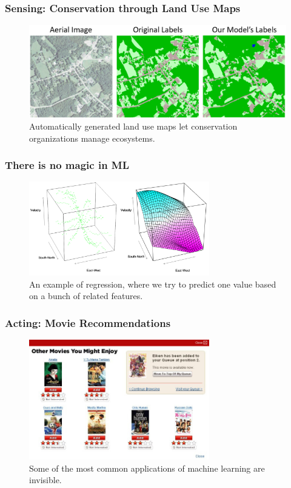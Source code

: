 \documentclass[10pt,mathserif]{beamer}
\begin{document}
\begin{frame}
  \frametitle{Sensing: Conservation through Land Use Maps}
  \begin{figure}[ht]
    \centering
    \includegraphics[width=0.7\paperwidth]{figures/landcover}
    \caption{Automatically generated land use maps let conservation
      organizations manage ecosystems. \label{fig:landcover} }
  \end{figure}
\end{frame}

\begin{frame}
  \frametitle{There is no magic in ML}
  \begin{figure}[ht]
    \centering
    \includegraphics[width=0.7\textwidth]{figures/galaxy}
    \caption{An example of regression, where we try to predict one value based
      on a bunch of related features. \label{fig:astronomy} }
  \end{figure}
\end{frame}

\begin{frame}
  \frametitle{Acting: Movie Recommendations}
  \begin{figure}[ht]
    \centering
    \includegraphics[width=0.7\textwidth]{figures/netflix_abstraction}
    \caption{Some of the most common applications of machine learning are
      invisible.}
  \end{figure}
\end{frame}
\end{document}
